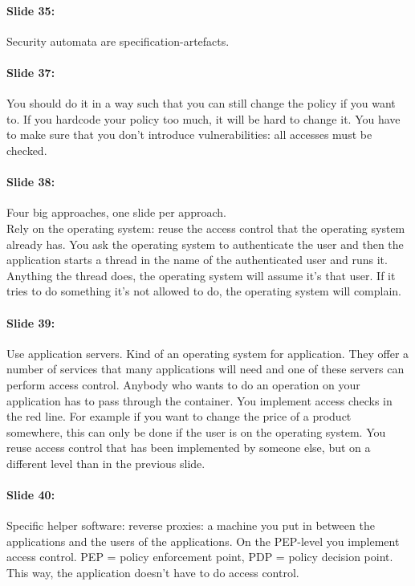 \documentclass[10pt,a4paper]{report}
\begin{document}
\paragraph{Slide 35:} Security automata are specification-artefacts.

\paragraph{Slide 37:} You should do it in a way such that you can still change the policy if you want to. If you hardcode your policy too much, it will be hard to change it. You have to make sure that you don't introduce vulnerabilities: all accesses must be checked.

\paragraph{Slide 38:} Four big approaches, one slide per approach.\\
Rely on the operating system: reuse the access control that the operating system already has. You ask the operating system to authenticate the user and then the application starts a thread in the name of the authenticated user and runs it. Anything the thread does, the operating system will assume it's that user. If it tries to do something it's not allowed to do, the operating system will complain.

\paragraph{Slide 39:} Use application servers. Kind of an operating system for application. They offer a number of services that many applications will need and one of these servers can perform access control. Anybody who wants to do an operation on your application has to pass through the container. You implement access checks in the red line. For example if you want to change the price of a product somewhere, this can only be done if the user is on the operating system. You reuse access control that has been implemented by someone else, but on a different level than in the previous slide.

\paragraph{Slide 40:} Specific helper software: reverse proxies: a machine you put in between the applications and the users of the applications. On the PEP-level you implement access control. PEP = policy enforcement point, PDP = policy decision point. This way, the application doesn't have to do access control.
\end{document}
